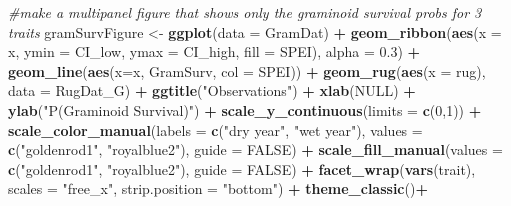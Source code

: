 \documentclass[
]{article}
\newenvironment{Shaded}{\begin{snugshade}}{\end{snugshade}}
\newcommand{\CommentTok}[1]{\textcolor[rgb]{0.56,0.35,0.01}{\textit{#1}}}
\newcommand{\DataTypeTok}[1]{\textcolor[rgb]{0.13,0.29,0.53}{#1}}
\newcommand{\DecValTok}[1]{\textcolor[rgb]{0.00,0.00,0.81}{#1}}
\newcommand{\FloatTok}[1]{\textcolor[rgb]{0.00,0.00,0.81}{#1}}
\newcommand{\KeywordTok}[1]{\textcolor[rgb]{0.13,0.29,0.53}{\textbf{#1}}}
\newcommand{\NormalTok}[1]{#1}
\newcommand{\OperatorTok}[1]{\textcolor[rgb]{0.81,0.36,0.00}{\textbf{#1}}}
\newcommand{\OtherTok}[1]{\textcolor[rgb]{0.56,0.35,0.01}{#1}}
\newcommand{\StringTok}[1]{\textcolor[rgb]{0.31,0.60,0.02}{#1}}
\begin{document}
\begin{Shaded}
\begin{Highlighting}[]
\CommentTok{\#make a multipanel figure that shows only the graminoid survival probs for 3 traits}
\NormalTok{gramSurvFigure \textless{}{-}}\StringTok{ }\KeywordTok{ggplot}\NormalTok{(}\DataTypeTok{data =}\NormalTok{ GramDat) }\OperatorTok{+}
\StringTok{  }\KeywordTok{geom\_ribbon}\NormalTok{(}\KeywordTok{aes}\NormalTok{(}\DataTypeTok{x =}\NormalTok{ x, }\DataTypeTok{ymin =}\NormalTok{ CI\_low, }\DataTypeTok{ymax =}\NormalTok{ CI\_high, }\DataTypeTok{fill =}\NormalTok{ SPEI), }\DataTypeTok{alpha =} \FloatTok{0.3}\NormalTok{) }\OperatorTok{+}
\StringTok{  }\KeywordTok{geom\_line}\NormalTok{(}\KeywordTok{aes}\NormalTok{(}\DataTypeTok{x=}\NormalTok{x, GramSurv, }\DataTypeTok{col =}\NormalTok{ SPEI))  }\OperatorTok{+}\StringTok{ }
\StringTok{  }\KeywordTok{geom\_rug}\NormalTok{(}\KeywordTok{aes}\NormalTok{(}\DataTypeTok{x =}\NormalTok{ rug), }\DataTypeTok{data =}\NormalTok{ RugDat\_G) }\OperatorTok{+}
\StringTok{  }\KeywordTok{ggtitle}\NormalTok{(}\StringTok{"Observations"}\NormalTok{) }\OperatorTok{+}
\StringTok{  }\KeywordTok{xlab}\NormalTok{(}\OtherTok{NULL}\NormalTok{) }\OperatorTok{+}
\StringTok{  }\KeywordTok{ylab}\NormalTok{(}\StringTok{"P(Graminoid Survival)"}\NormalTok{) }\OperatorTok{+}
\StringTok{  }\KeywordTok{scale\_y\_continuous}\NormalTok{(}\DataTypeTok{limits =} \KeywordTok{c}\NormalTok{(}\DecValTok{0}\NormalTok{,}\DecValTok{1}\NormalTok{)) }\OperatorTok{+}
\StringTok{  }\KeywordTok{scale\_color\_manual}\NormalTok{(}\DataTypeTok{labels =} \KeywordTok{c}\NormalTok{(}\StringTok{"dry year"}\NormalTok{, }\StringTok{"wet year"}\NormalTok{), }\DataTypeTok{values =} \KeywordTok{c}\NormalTok{(}\StringTok{"goldenrod1"}\NormalTok{, }\StringTok{"royalblue2"}\NormalTok{), }\DataTypeTok{guide =} \OtherTok{FALSE}\NormalTok{) }\OperatorTok{+}
\StringTok{  }\KeywordTok{scale\_fill\_manual}\NormalTok{(}\DataTypeTok{values =} \KeywordTok{c}\NormalTok{(}\StringTok{"goldenrod1"}\NormalTok{, }\StringTok{"royalblue2"}\NormalTok{), }\DataTypeTok{guide =} \OtherTok{FALSE}\NormalTok{) }\OperatorTok{+}
\StringTok{  }\KeywordTok{facet\_wrap}\NormalTok{(}\KeywordTok{vars}\NormalTok{(trait), }\DataTypeTok{scales =} \StringTok{"free\_x"}\NormalTok{, }\DataTypeTok{strip.position =}  \StringTok{"bottom"}\NormalTok{) }\OperatorTok{+}
\StringTok{  }\KeywordTok{theme\_classic}\NormalTok{()}\OperatorTok{+}

\end{Highlighting}
\end{Shaded}
\end{document}
